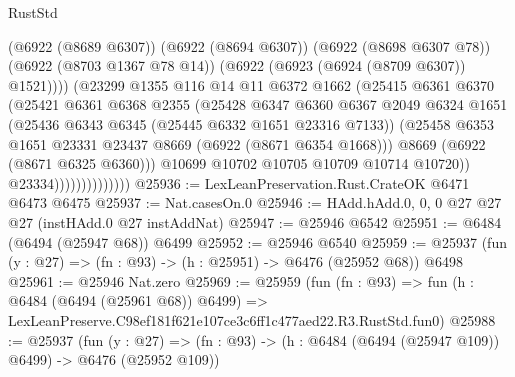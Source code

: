\begin{lexlean}{RustStd}
\begin{coremodule}
                                  (@6922 (@8689 @6307))
                                  (@6922 (@8694 @6307))
                                  (@6922 (@8698 @6307 @78))
                                  (@6922 (@8703 @1367 @78 @14))
                                  (@6922 (@6923 (@6924 (@8709 @6307)) @1521))))
                              (@23299
                                @1355
                                @116
                                @14
                                @11
                                @6372
                                @1662
                                (@25415
                                  @6361
                                  @6370
                                  (@25421
                                    @6361
                                    @6368
                                    @2355
                                    (@25428
                                      @6347
                                      @6360
                                      @6367
                                      @2049
                                      @6324
                                      @1651
                                      (@25436 @6343 @6345 (@25445 @6332 @1651 @23316 @7133))
                                      (@25458
                                        @6353
                                        @1651
                                        @23331
                                        @23437
                                        @8669
                                        (@6922 (@8671 @6354 @1668)))
                                      @8669
                                      (@6922 (@8671 @6325 @6360)))
                                    @10699
                                    @10702
                                    @10705
                                    @10709
                                    @10714
                                    @10720))
                                @23334))))))))))))))
@25936 := LexLeanPreservation.Rust.CrateOK @6471 @6473 @6475
@25937 := Nat.casesOn.{0}
@25946 := HAdd.hAdd.{0, 0, 0} @27 @27 @27 (instHAdd.{0} @27 instAddNat)
@25947 := @25946 @6542
@25951 := @6484 (@6494 (@25947 @68)) @6499
@25952 := @25946 @6540
@25959 := @25937 (fun (y : @27) => (fn : @93) -> (h : @25951) -> @6476 (@25952 @68)) @6498
@25961 := @25946 Nat.zero
@25969 := @25959
    (fun (fn : @93) =>
    fun (h : @6484 (@6494 (@25961 @68)) @6499) =>
    LexLeanPreserve.C98ef181f621e107ce3c6ff1c477aed22.R3.RustStd.fun0)
@25988 := @25937
    (fun (y : @27) => (fn : @93) -> (h : @6484 (@6494 (@25947 @109)) @6499) -> @6476 (@25952 @109))

\end{coremodule}
\end{lexlean}

